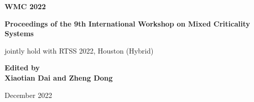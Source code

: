 \begin{titlepage}
    \begin{center}
        \vspace*{1.5cm}
        
        \Huge
        \textbf{{WMC 2022}} \\
        \vspace*{1.5cm}
        
        \large \textbf{Proceedings of the 9th International Workshop on Mixed Criticality Systems} 
        
        \vspace*{2.5cm}
        
        \normalsize
        jointly hold with RTSS 2022, Houston (Hybrid)
        
        \vspace*{4cm}
        
        \large
        \textbf{Edited by} \\
        \vspace*{.2cm}
        \textbf{Xiaotian Dai and Zheng Dong} \\
        \vspace*{.5cm}
        
        
        \vspace*{.5cm}
        December 2022
        
        
        \vfill
        
    \end{center}
\end{titlepage}